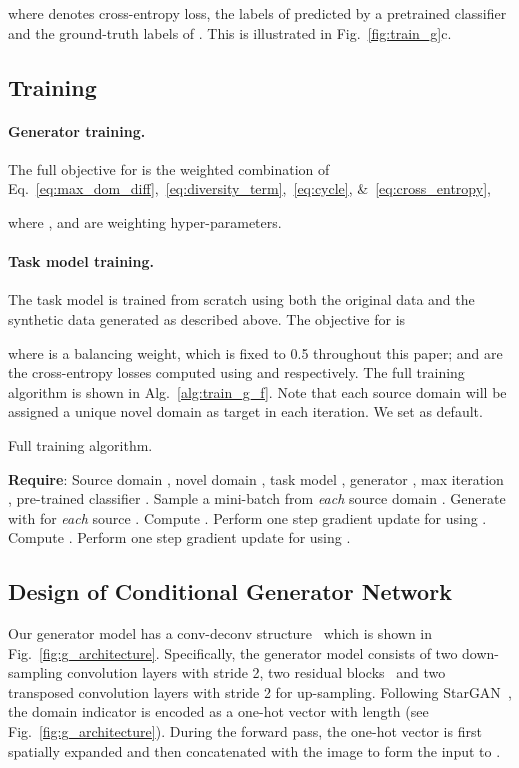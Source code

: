 \documentclass[runningheads]{llncs}
\begin{document}
where  denotes cross-entropy loss,  the labels of  predicted by a pretrained classifier and  the ground-truth labels of . This is illustrated in Fig.~\ref{fig:train_g}c.

\subsection{Training}
\paragraph{Generator training.}
The full objective for  is the weighted combination of Eq.~\eqref{eq:max_dom_diff},~\eqref{eq:diversity_term},~\eqref{eq:cycle}, \&~\eqref{eq:cross_entropy},

where ,  and  are weighting hyper-parameters.

\paragraph{Task model training.}
The task model  is trained from scratch using both the original data  and the synthetic data  generated as described above. The objective for  is

where  is a balancing weight, which is fixed to 0.5 throughout this paper;  and  are the cross-entropy losses computed using  and  respectively. The full training algorithm is shown in Alg.~\ref{alg:train_g_f}. Note that each source domain  will be assigned a unique novel domain  as target in each iteration. We set  as default.

\begin{algorithm}[t]
\caption{Full training algorithm.}
\label{alg:train_g_f}
\footnotesize
\begin{algorithmic}[1] \STATE \textbf{Require}: Source domain , novel domain , task model , generator , max iteration , pre-trained classifier .
    \STATE Sample a mini-batch  from \emph{each} source domain .
    \STATE Generate  with  for \emph{each} source .
    \STATE Compute .
    \STATE Perform one step gradient update for  using .
    \STATE Compute .
    \STATE Perform one step gradient update for  using .
    \ENDFOR
\end{algorithmic}
\end{algorithm}

\subsection{Design of Conditional Generator Network} \label{subsec:design_g}
Our generator model has a conv-deconv structure~\cite{CycleGAN,StarGAN} which is shown in Fig.~\ref{fig:g_architecture}. Specifically, the generator model consists of two down-sampling convolution layers with stride 2, two residual blocks~\cite{he2016deep} and two transposed convolution layers with stride 2 for up-sampling. Following StarGAN~\cite{StarGAN}, the domain indicator is encoded as a one-hot vector with length  (see Fig.~\ref{fig:g_architecture}). During the forward pass, the one-hot vector is first spatially expanded and then concatenated with the image to form the input to .
\end{document}
